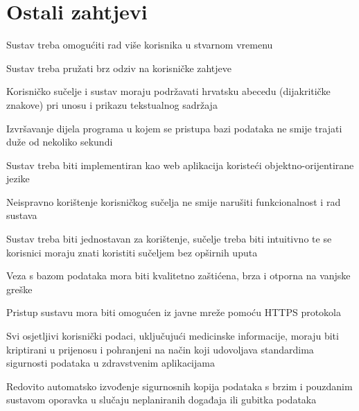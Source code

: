 		\section{Ostali zahtjevi}
			 \begin{packed_item}
				\item Sustav treba omogućiti rad više korisnika u stvarnom vremenu
				\item Sustav treba pružati brz odziv na korisničke zahtjeve
				\item Korisničko sučelje i sustav moraju podržavati hrvatsku abecedu (dijakritičke znakove) pri unosu i prikazu tekstualnog sadržaja
				\item Izvršavanje dijela programa u kojem se pristupa bazi podataka ne smije trajati duže od nekoliko sekundi
				\item Sustav treba biti implementiran kao web aplikacija koristeći objektno-orijentirane jezike
				\item Neispravno korištenje korisničkog sučelja ne smije narušiti funkcionalnost i rad sustava
				\item Sustav treba biti jednostavan za korištenje, sučelje treba biti intuitivno te se korisnici moraju znati koristiti sučeljem bez opširnih uputa
				\item Veza s bazom podataka mora biti kvalitetno zaštićena, brza i otporna na vanjske greške
				\item Pristup sustavu mora biti omogućen iz javne mreže pomoću HTTPS protokola
				\item Svi osjetljivi korisnički podaci, uključujući medicinske informacije, moraju biti kriptirani u 
				prijenosu i pohranjeni na način koji udovoljava standardima sigurnosti podataka u zdravstvenim aplikacijama
				\item Redovito automatsko izvođenje sigurnosnih kopija podataka s brzim i pouzdanim sustavom oporavka u slučaju neplaniranih događaja ili gubitka podataka
			 \end{packed_item}
			 	 
			 
	